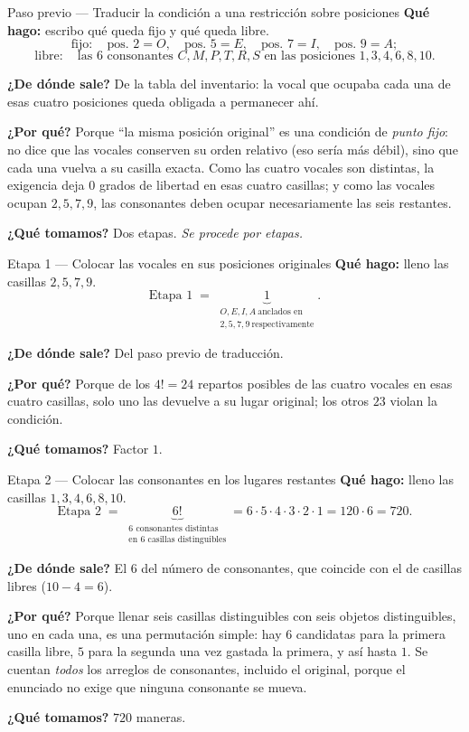 \documentclass[11pt]{article}
\begin{document}
\begin{paso}{Paso previo --- Traducir la condici\'on a una restricci\'on sobre posiciones}
\textbf{Qu\'e hago:} escribo qu\'e queda fijo y qu\'e queda libre.
\[
\text{fijo}:\quad \text{pos. }2=O,\quad \text{pos. }5=E,\quad \text{pos. }7=I,\quad \text{pos. }9=A ;
\]
\[
\text{libre}:\quad \text{las } 6 \text{ consonantes } C,M,P,T,R,S \text{ en las posiciones } 1,3,4,6,8,10 .
\]

\textbf{¿De d\'onde sale?} De la tabla del inventario: la vocal que ocupaba cada una de esas cuatro
posiciones queda obligada a permanecer ah\'i.

\textbf{¿Por qu\'e?} Porque ``la misma posici\'on original'' es una condici\'on de \emph{punto fijo}: no dice
que las vocales conserven su orden relativo (eso ser\'ia m\'as d\'ebil), sino que cada una vuelva a su
casilla exacta. Como las cuatro vocales son distintas, la exigencia deja $0$ grados de libertad en esas
cuatro casillas; y como las vocales ocupan $2,5,7,9$, las consonantes deben ocupar necesariamente las seis
restantes.

\textbf{¿Qu\'e tomamos?} Dos etapas. \emph{Se procede por etapas.}
\end{paso}

\begin{paso}{Etapa 1 --- Colocar las vocales en sus posiciones originales}
\textbf{Qu\'e hago:} lleno las casillas $2,5,7,9$.
\[
\text{Etapa 1}\;=\;\underbrace{1}_{\substack{O,E,I,A\ \text{anclados en}\\ 2,5,7,9\ \text{respectivamente}}} .
\]

\textbf{¿De d\'onde sale?} Del paso previo de traducci\'on.

\textbf{¿Por qu\'e?} Porque de los $4!=24$ repartos posibles de las cuatro vocales en esas cuatro casillas,
solo uno las devuelve a su lugar original; los otros $23$ violan la condici\'on.

\textbf{¿Qu\'e tomamos?} Factor $1$.
\end{paso}

\begin{paso}{Etapa 2 --- Colocar las consonantes en los lugares restantes}
\textbf{Qu\'e hago:} lleno las casillas $1,3,4,6,8,10$.
\[
\text{Etapa 2}\;=\;\underbrace{6!}_{\substack{\text{6 consonantes distintas}\\ \text{en 6 casillas distinguibles}}}
=6\cdot 5\cdot 4\cdot 3\cdot 2\cdot 1=120\cdot 6=720 .
\]

\textbf{¿De d\'onde sale?} El $6$ del n\'umero de consonantes, que coincide con el de casillas libres
($10-4=6$).

\textbf{¿Por qu\'e?} Porque llenar seis casillas distinguibles con seis objetos distinguibles, uno en cada
una, es una permutaci\'on simple: hay $6$ candidatas para la primera casilla libre, $5$ para la segunda una
vez gastada la primera, y as\'i hasta $1$. Se cuentan \emph{todos} los arreglos de consonantes, incluido el
original, porque el enunciado no exige que ninguna consonante se mueva.

\textbf{¿Qu\'e tomamos?} $720$ maneras.
\end{paso}
\end{document}
